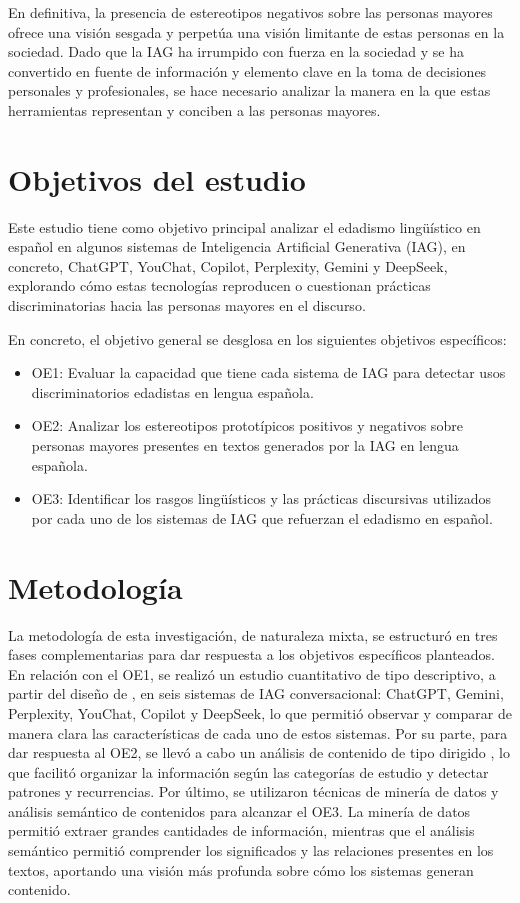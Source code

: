 \documentclass[spanish]{textolivre}
\begin{document}
En definitiva, la presencia de estereotipos negativos sobre las personas mayores ofrece una visión sesgada y perpetúa una visión limitante de estas personas en la sociedad. Dado que la IAG ha irrumpido con fuerza en la sociedad y se ha convertido en fuente de información y elemento clave en la toma de decisiones personales y profesionales, se hace necesario analizar la manera en la que estas herramientas representan y conciben a las personas mayores.

\section{Objetivos del estudio}
Este estudio tiene como objetivo principal analizar el edadismo lingüístico en español en algunos sistemas de Inteligencia Artificial Generativa (IAG), en concreto, ChatGPT, YouChat, Copilot, Perplexity, Gemini y DeepSeek, explorando cómo estas tecnologías reproducen o cuestionan prácticas discriminatorias hacia las personas mayores en el discurso.

En concreto, el objetivo general se desglosa en los siguientes objetivos específicos:

\begin{itemize}
    \item OE1: Evaluar la capacidad que tiene cada sistema de IAG para detectar usos discriminatorios edadistas en lengua española.
    \item OE2: Analizar los estereotipos prototípicos positivos y negativos sobre personas mayores presentes en textos generados por la IAG en lengua española.
    \item OE3: Identificar los rasgos lingüísticos y las prácticas discursivas utilizados por cada uno de los sistemas de IAG que refuerzan el edadismo en español.
\end{itemize}

\section{Metodología}
La metodología de esta investigación, de naturaleza mixta, se estructuró en tres fases complementarias para dar respuesta a los objetivos específicos planteados. En relación con el OE1, se realizó un estudio cuantitativo de tipo descriptivo, a partir del diseño de \textcite{arandarubio2024}, en seis sistemas de IAG conversacional: ChatGPT, Gemini, Perplexity, YouChat, Copilot y DeepSeek, lo que permitió observar y comparar de manera clara las características de cada uno de estos sistemas. Por su parte, para dar respuesta al OE2, se llevó a cabo un análisis de contenido de tipo dirigido \cite{hsieh2005}, lo que facilitó organizar la información según las categorías de estudio y detectar patrones y recurrencias. Por último, se utilizaron técnicas de minería de datos \cite{kimmons2018} y análisis semántico de contenidos \cite{neuendorf2017} para alcanzar el OE3. La minería de datos permitió extraer grandes cantidades de información, mientras que el análisis semántico permitió comprender los significados y las relaciones presentes en los textos, aportando una visión más profunda sobre cómo los sistemas generan contenido.
\end{document}
